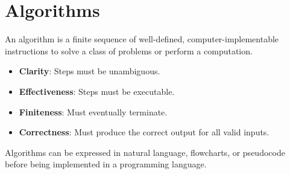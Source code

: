 \documentclass[11pt,oneside]{book}
\begin{document}
\section{Algorithms}
\label{sec:algorithms}
An algorithm is a finite sequence of well-defined, computer-implementable instructions to solve a class of problems or perform a computation.
\begin{itemize}
    \item \textbf{Clarity}: Steps must be unambiguous.
    \item \textbf{Effectiveness}: Steps must be executable.
    \item \textbf{Finiteness}: Must eventually terminate.
    \item \textbf{Correctness}: Must produce the correct output for all valid inputs.
\end{itemize}
Algorithms can be expressed in natural language, flowcharts, or pseudocode before being implemented in a programming language.
\end{document}
